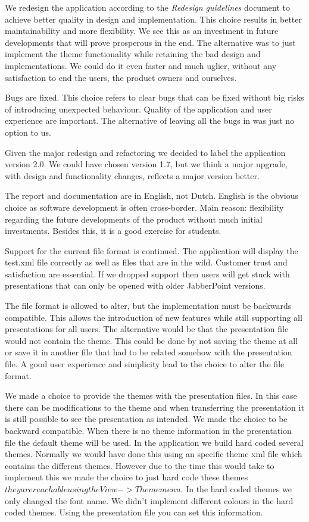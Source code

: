 \documentclass[a4paper]{article}
\begin{document}
We redesign the application according to the \textit{Redesign guidelines} document to achieve better quality in design and implementation. This choice results in better maintainability and more flexibility. We see this as an investment in future developments that will prove prosperous in the end. The alternative was to just implement the theme functionality while retaining the bad design and implementations. We could do it even faster and much uglier, without any satisfaction to end the users, the product owners and ourselves.

Bugs are fixed. This choice refers to clear bugs that can be fixed without big risks of introducing unexpected behaviour. Quality of the application and user experience are important. The alternative of leaving all the bugs in was just no option to us.

Given the major redesign and refactoring we decided to label the application version 2.0. We could have chosen version 1.7, but we think a major upgrade, with design and functionality changes, reflects a major version better. 

The report and documentation are in English, not Dutch. English is the obvious choice as software development is often cross-border. Main reason: flexibility regarding the future developments of the product without much initial investments. Besides this, it is a good exercise for students.

Support for the current file format is continued. The application will display the test.xml file correctly as well as files that are in the wild. Customer trust and satisfaction are essential. If we dropped support then users will get stuck with presentations that can only be opened with older JabberPoint versions.
 
The file format is allowed to alter, but the implementation must be backwards compatible. This allows the introduction of new features while still supporting all presentations for all users. The alternative would be that the presentation file would not contain the theme. This could be done by not saving the theme at all or save it in another file that had to be related somehow with the presentation file. A good user experience and simplicity lead to the choice to alter the file format.

We made a choice to provide the themes with the presentation files. In this case there can be modifications to the theme and when transferring the presentation it is still possible to see the presentation as intended. We made the choice to be backward compatible. When there is no theme information in the presentation file the default theme will be used. In the application we build hard coded several themes. Normally we would have done this using an specific theme xml file which contains the different themes. However due to the time this would take to implement this we made the choice to just hard code these themes \(they are reachable using the View->Theme menu. \) In the hard coded themes we only changed the font name. We didn't implement different colours in the hard coded themes. Using the presentation file you can set this information.
\end{document}
